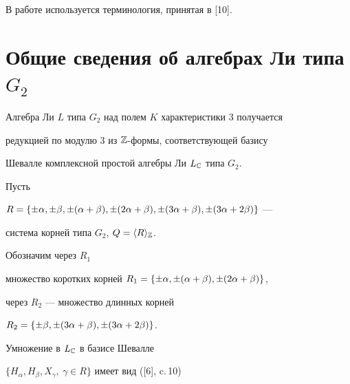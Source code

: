 В работе используется терминология, принятая в  [10].


 


\section{Общие сведения об алгебрах Ли типа $G_2$} 


 


Алгебра Ли $L$ типа $G_2$ над полем $K$ характеристики 3 получается 


редукцией по модулю 3 из $\Bbb Z$-формы, соответствующей базису 


Шевалле комплексной простой алгебры Ли $L_{\Bbb C}$ типа $G_2$. 


 


Пусть 


$R=\{\pm\alpha,\pm\beta,\pm(\alpha+\beta),\pm(2\alpha+\beta),\pm(3\alpha+\beta),\pm(3\alpha+2\beta)\}$ --- 


система корней типа $G_2$, $Q=\langle R\rangle_{\Bbb Z}$. 


Обозначим через $R_1$ 


множество коротких корней $R_1=\{\pm\alpha,\pm(\alpha+\beta),\pm(2\alpha+\beta)\}$, 


через $R_2$ --- множество длинных корней 


$R_2=\{\pm\beta,\pm(3\alpha+\beta),\pm(3\alpha+2\beta)\}$. 


 


Умножение в $L_{\Bbb C}$ в базисе Шевалле 


$\{H_\alpha,H_\beta,X_\gamma,\ \gamma\in R\}$ имеет вид ([6], c.\,10) 


